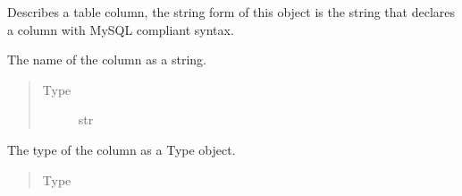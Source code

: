 \documentclass[letterpaper,10pt,english]{sphinxmanual}
\begin{document}
\begin{fulllineitems}
\label{\detokenize{model:mini_sql.model.column.Column}}
\sphinxAtStartPar
Describes a table column, the string form of this object is the
string that declares a column with MySQL compliant syntax.

\begin{fulllineitems}
\label{\detokenize{model:mini_sql.model.column.Column.__name}}
\sphinxAtStartPar
The name of the column as a string.
\begin{quote}\begin{description}
\item[{Type}] \leavevmode
\sphinxAtStartPar
str

\end{description}\end{quote}

\end{fulllineitems}


\begin{fulllineitems}
\label{\detokenize{model:mini_sql.model.column.Column.__type}}
\sphinxAtStartPar
The type of the column as a Type object.
\begin{quote}\begin{description}
\item[{Type}] \leavevmode
\sphinxAtStartPar
{\hyperref[\detokenize{model:mini_sql.model.type.Type}]{}}


\end{description}
\end{quote}
\end{fulllineitems}
\end{fulllineitems}
\end{document}
